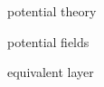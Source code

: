 \documentclass[draft]{agujournal2019}
\begin{document}






\begin{keypoints}
\item potential theory
\item potential fields
\item equivalent layer
\end{keypoints}

%
%

%
%


\end{document}
